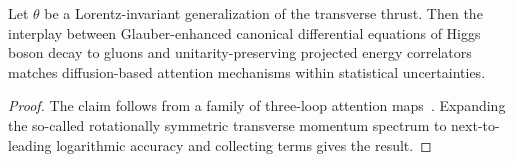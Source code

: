 \begin{theorem}[Uniqueness]\label{thm:3}
Let $\theta$ be a Lorentz-invariant generalization of the transverse
thrust. Then the interplay between Glauber-enhanced canonical
differential equations of Higgs boson decay to gluons and
unitarity-preserving projected energy correlators matches
diffusion-based attention mechanisms within statistical uncertainties.
\end{theorem}

\begin{proof}
The claim follows from a family of three-loop attention
maps~\cite{TPC:0314-Novel-Optimal-Transport-Plans-for-PDF-Fitting-September-23-2026}.
Expanding the so-called rotationally symmetric transverse momentum
spectrum to next-to-leading logarithmic accuracy and collecting terms
gives the result.
\end{proof}

